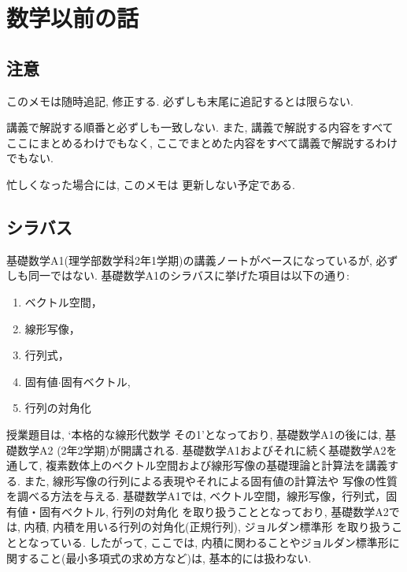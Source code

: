 \frontmatter
\let\originalthesection\thesection
\renewcommand{\thesection}{\alph{section}}

\chapter{数学以前の話}
\section{注意}
このメモは随時追記, 修正する.
必ずしも末尾に追記するとは限らない.

講義で解説する順番と必ずしも一致しない.
また, 講義で解説する内容をすべてここにまとめるわけでもなく,
ここでまとめた内容をすべて講義で解説するわけでもない.

忙しくなった場合には,
このメモは
更新しない予定である.

\section{シラバス}
基礎数学A1(理学部数学科2年1学期)の講義ノートがベースになっているが,
必ずしも同一ではない.
基礎数学A1のシラバスに挙げた項目は以下の通り:
\begin{enumerate}
\item
  ベクトル空間，
\item 線形写像，
\item 行列式，
\item 固有値$\cdot$固有ベクトル,
\item 行列の対角化
\end{enumerate}

授業題目は, `本格的な線形代数学 その1'となっており,
基礎数学A1の後には, 基礎数学A2 (2年2学期)が開講される.
基礎数学A1およびそれに続く基礎数学A2を通して,
複素数体上のベクトル空間および線形写像の基礎理論と計算法を講義する.
また, 線形写像の行列による表現やそれによる固有値の計算法や
写像の性質を調べる方法を与える.
基礎数学A1では,
ベクトル空間，線形写像，行列式，固有値・固有ベクトル, 行列の対角化
を取り扱うこととなっており,
基礎数学A2では,
内積, 内積を用いる行列の対角化(正規行列),
ジョルダン標準形
を取り扱うこととなっている.
したがって,
ここでは, 
内積に関わることやジョルダン標準形に関すること(最小多項式の求め方など)は,
基本的には扱わない.

